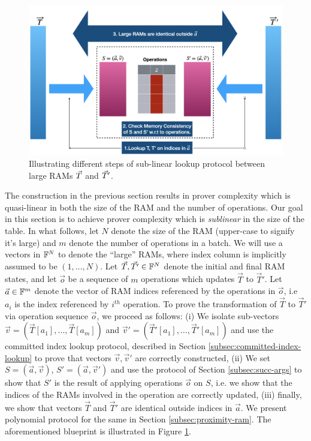 \begin{figure}[htbp]
    \centering
    \includegraphics[width=\textwidth]{RAM-Lookup}
    \caption{Illustrating different steps of sub-linear lookup protocol between large RAMs $\vec{T}$ and $\vec{T}'$.}
    \label{fig:blueprint}
\end{figure}

The construction in the previous section results in prover complexity which is quasi-linear in both the
size of the RAM and the number of operations.
Our goal in this section is to achieve prover complexity which is {\em sublinear} in the size of the table. In
what follows, let $N$ denote the size of the RAM (upper-case to signify it's large) and $m$ denote the number
of operations in a batch. We will use a vectors in $\mathbb{F}^N$ to denote the ``large'' RAMs, where index column is implicitly
assumed to be $(1,\ldots,N)$.
Let $\vec{T},\vec{T'}\in \mathbb{F}^N$ denote the initial and final RAM states, and let $\vec{o}$ be
a sequence of $m$ operations which updates $\vec{T}$ to $\vec{T}'$. Let $\vec{a}\in \mathbb{F}^m$ denote the vector
of RAM indices referenced by the operations in $\vec{o}$, i.e $a_i$ is the index referenced by $i^{th}$ operation.
To prove the transformation of $\vec{T}$ to $\vec{T}'$ via operation sequence $\vec{o}$, we proceed as follows:
(i) We isolate sub-vectors $\vec{v}=(\vec{T}[a_1],\ldots,\vec{T}[a_m])$ and
$\vec{v}'=(\vec{T}'[a_1],\ldots,\vec{T}'[a_m])$ and use the committed index lookup protocol, described in
Section \ref{subsec:committed-index-lookup} to prove that vectors $\vec{v},\vec{v}'$ are correctly constructed,
(ii) We set $S=(\vec{a},\vec{v})$, $S'=(\vec{a},\vec{v}')$ and use the protocol of Section \ref{subsec:succ-args} to show
that $S'$ is the result of applying operations $\vec{o}$ on $S$, i.e. we show that the indices of the RAMs involved in the operation
are correctly updated, (iii) finally, we show that vectors $\vec{T}$ and $\vec{T}'$ are identical outside indices in $\vec{a}$.
We present polynomial protocol for the same in Section \ref{subsec:proximity-ram}. The aforementioned blueprint is illustrated
in Figure \ref{fig:blueprint}.

